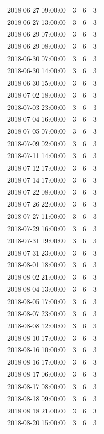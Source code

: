 \begin{tabular}{lrrr}
2018-06-27 09:00:00 & 3 & 6 & 3 \\
2018-06-27 13:00:00 & 3 & 6 & 3 \\
2018-06-29 07:00:00 & 3 & 6 & 3 \\
2018-06-29 08:00:00 & 3 & 6 & 3 \\
2018-06-30 07:00:00 & 3 & 6 & 3 \\
2018-06-30 14:00:00 & 3 & 6 & 3 \\
2018-06-30 15:00:00 & 3 & 6 & 3 \\
2018-07-02 18:00:00 & 3 & 6 & 3 \\
2018-07-03 23:00:00 & 3 & 6 & 3 \\
2018-07-04 16:00:00 & 3 & 6 & 3 \\
2018-07-05 07:00:00 & 3 & 6 & 3 \\
2018-07-09 02:00:00 & 3 & 6 & 3 \\
2018-07-11 14:00:00 & 3 & 6 & 3 \\
2018-07-12 17:00:00 & 3 & 6 & 3 \\
2018-07-14 17:00:00 & 3 & 6 & 3 \\
2018-07-22 08:00:00 & 3 & 6 & 3 \\
2018-07-26 22:00:00 & 3 & 6 & 3 \\
2018-07-27 11:00:00 & 3 & 6 & 3 \\
2018-07-29 16:00:00 & 3 & 6 & 3 \\
2018-07-31 19:00:00 & 3 & 6 & 3 \\
2018-07-31 23:00:00 & 3 & 6 & 3 \\
2018-08-01 18:00:00 & 3 & 6 & 3 \\
2018-08-02 21:00:00 & 3 & 6 & 3 \\
2018-08-04 13:00:00 & 3 & 6 & 3 \\
2018-08-05 17:00:00 & 3 & 6 & 3 \\
2018-08-07 23:00:00 & 3 & 6 & 3 \\
2018-08-08 12:00:00 & 3 & 6 & 3 \\
2018-08-10 17:00:00 & 3 & 6 & 3 \\
2018-08-16 10:00:00 & 3 & 6 & 3 \\
2018-08-16 17:00:00 & 3 & 6 & 3 \\
2018-08-17 06:00:00 & 3 & 6 & 3 \\
2018-08-17 08:00:00 & 3 & 6 & 3 \\
2018-08-18 09:00:00 & 3 & 6 & 3 \\
2018-08-18 21:00:00 & 3 & 6 & 3 \\
2018-08-20 15:00:00 & 3 & 6 & 3 \\

\end{tabular}
